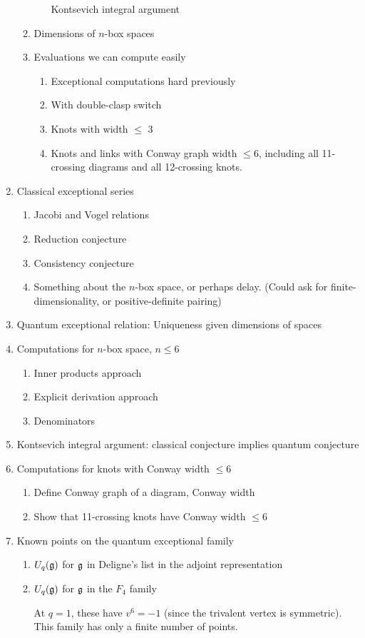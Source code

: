 \documentclass[12pt]{amsart}
\begin{document}
\begin{enumerate}
\begin{enumerate}
\begin{enumerate}
      Kontsevich integral argument
    \end{enumerate}
  \item Dimensions of $n$-box spaces
  \item Evaluations we can compute easily
    \begin{enumerate}
    \item Exceptional computations hard previously
    \item With double-clasp switch
    \item Knots with width $\le $ 3
    \item Knots and links with Conway graph width $\le 6$,
      including all 11-crossing diagrams and all 12-crossing
      knots.
    \end{enumerate}
  \end{enumerate}
\item Classical exceptional series
  \begin{enumerate}
  \item Jacobi and Vogel relations
  \item Reduction conjecture
  \item Consistency conjecture
  \item Something about the $n$-box space, or perhaps delay. (Could
    ask for finite-dimensionality, or positive-definite pairing)
  \end{enumerate}
\item Quantum exceptional relation: Uniqueness given dimensions of
  spaces
\item Computations for $n$-box space, $n \le 6$
  \begin{enumerate}
  \item Inner products approach
  \item Explicit derivation approach
  \item Denominators
  \end{enumerate}
\item Kontsevich integral argument: classical conjecture implies
  quantum conjecture
\item Computations for knots with Conway width $\le 6$
  \begin{enumerate}
  \item Define Conway graph of a diagram, Conway width
  \item Show that 11-crossing knots have Conway width $\le 6$
  \end{enumerate}
\item Known points on the quantum exceptional family
  \begin{enumerate}
  \item $U_q({\mathfrak g})$ for ${\mathfrak g}$ in Deligne's list in the adjoint
    representation
  \item $U_q({\mathfrak g})$ for ${\mathfrak g}$ in the $F_4$ family

    At $q=1$, these have $v^6=-1$ (since the trivalent vertex is
    symmetric). This family has only a finite number of points.
  \end{enumerate}
\end{enumerate}
\end{document}
